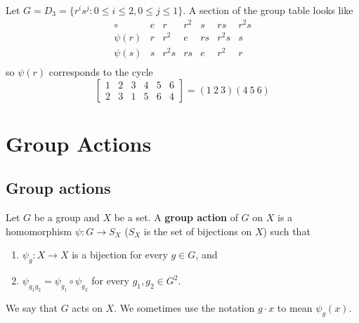 \begin{example}
	Let $G = D_3 = \{ r^i s^j: 0 \le i \le 2, 0 \le j \le 1 \}$. A section of the group table looks like
	\[
		\begin{matrix}
			\circ & e & r & r^2 & s & rs & r^2 s \\
			\psi(r) & r & r^2 & e & rs & r^2 s & s \\
			\psi(s) & s & r^2 s & rs & e & r^2 & r \\
		\end{matrix}
	\]
	so $\psi(r)$ corresponds to the cycle
	\[
		\begin{bmatrix}
			1 & 2 & 3 & 4 & 5 & 6 \\
			2 & 3 & 1 & 5 & 6 & 4
		\end{bmatrix}
		= (1 \ 2 \ 3) (4 \ 5 \ 6)
	\]
\end{example}

\section{Group Actions}

\subsection{Group actions}

\begin{definition}\label{def:groupAction}
	Let $G$ be a group and $X$ be a set. A \textbf{group action} of $G$ on $X$ is a homomorphism $\psi: G \rightarrow S_X$ ($S_X$ is the set of bijections on $X$) such that
	\begin{enumerate}
		\item $\psi_g: X \rightarrow X$ is a bijection for every $g \in G$, and
		\item $\psi_{g_1 g_2} = \psi_{g_1} \circ \psi_{g_2}$ for every $g_1, g_2 \in G^2$.
	\end{enumerate}
	We say that $G$ acts on $X$. We sometimes use the notation $g \cdot x$ to mean $\psi_g(x)$.
\end{definition}

%
%

